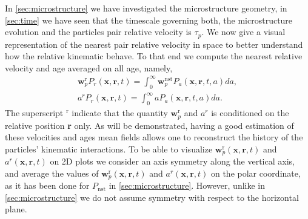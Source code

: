 
In \ref{sec:microstructure} we have investigated the microstructure geometry, 
in \ref{sec:time} we have seen that the timescale governing both, the microstructure evolution and the particles pair relative velocity is $\tau_p$.   
We now give a visual representation of the nearest pair relative velocity in space to better understand how the relative kinematic behave.  
To that end we compute the nearest relative velocity and age averaged on all age, namely,
\begin{align*}
    \textbf{w}^\text{r}_pP_r(\textbf{x},\textbf{r},t)
    =\int_0^\infty \textbf{w}^\text{nst}_pP_a(\textbf{x},\textbf{r},t,a) da,\\
    a^rP_r(\textbf{x},\textbf{r},t)
    =\int_0^\infty a P_a(\textbf{x},\textbf{r},t,a) da.
\end{align*}
The superscript $^\text{r}$ indicate that the quantity $\textbf{w}^\text{r}_p$ and $a^r$ is conditioned on the relative position \textbf{r} only.
As will be demonstrated, having a good estimation of these velocities and ages mean fields allows one to reconstruct the history of the particles' kinematic interactions. 
To be able to visualize
$\textbf{w}^\text{r}_p(\textbf{x},\textbf{r},t)$
and 
$a^r(\textbf{x},\textbf{r},t)$
on 2D plots we consider an axis symmetry along the vertical axis, and average the values of 
$\textbf{w}^\text{r}_p(\textbf{x},\textbf{r},t)$
and $a^r(\textbf{x},\textbf{r},t)$
on the polar coordinate, as it has been done for $P_\text{nst}$ in \ref{sec:microstructure}. 
However, unlike in \ref{sec:microstructure} we do not assume symmetry with respect to the horizontal plane. 

